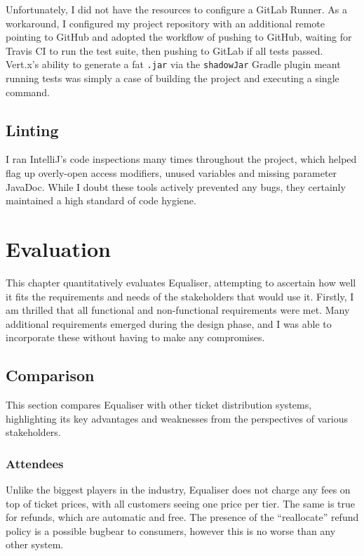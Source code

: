 \documentclass[12pt,a4paper]{bhamdissertation}
\newcommand{\code}[1]{\texttt{#1}}
\begin{document}
Unfortunately, I did not have the resources to configure a GitLab Runner. As a workaround, I configured my project repository with an additional remote pointing to GitHub and adopted the workflow of pushing to GitHub, waiting for Travis CI to run the test suite, then pushing to GitLab if all tests passed. Vert.x's ability to generate a fat \code{.jar} via the \code{shadowJar} Gradle plugin meant running tests was simply a case of building the project and executing a single command.

\section{Linting}

I ran IntelliJ's code inspections many times throughout the project, which helped flag up overly-open access modifiers, unused variables and missing parameter JavaDoc. While I doubt these tools actively prevented any bugs, they certainly maintained a high standard of code hygiene.

\chapter{Evaluation} \label{evaluation}

This chapter quantitatively evaluates Equaliser, attempting to ascertain how well it fits the requirements and needs of the stakeholders that would use it. Firstly, I am thrilled that all functional and non-functional requirements were met. Many additional requirements emerged during the design phase, and I was able to incorporate these without having to make any compromises.

\section{Comparison}

This section compares Equaliser with other ticket distribution systems, highlighting its key advantages and weaknesses from the perspectives of various stakeholders.

\subsection{Attendees}

Unlike the biggest players in the industry, Equaliser does not charge any fees on top of ticket prices, with all customers seeing one price per tier. The same is true for refunds, which are automatic and free. The presence of the ``reallocate'' refund policy is a possible bugbear to consumers, however this is no worse than any other system.
\end{document}
